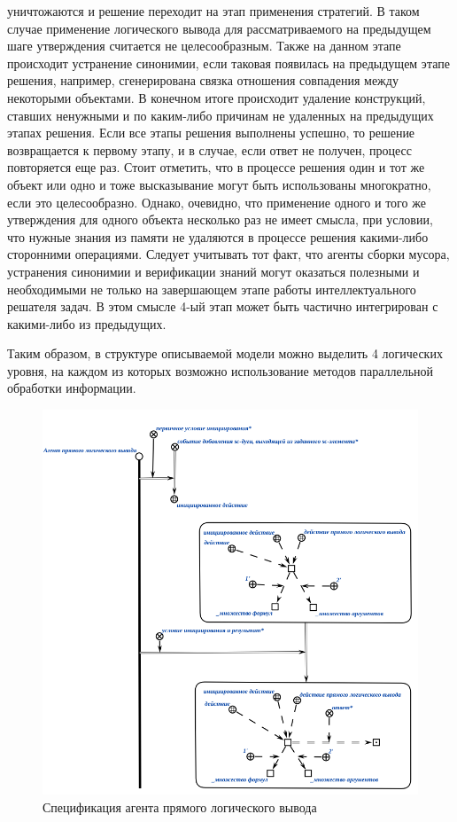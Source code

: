 \begin{itemize}
{	уничтожаются и решение переходит на этап применения стратегий. В таком случае применение логического вывода для рассматриваемого на предыдущем шаге утверждения считается не	целесообразным. Также на данном этапе происходит устранение синонимии, если таковая появилась на предыдущем этапе решения,
	например, сгенерирована связка отношения совпадения между некоторыми объектами. В конечном итоге происходит удаление конструкций, ставших ненужными и по каким-либо причинам не удаленных на предыдущих этапах решения. Если все этапы решения выполнены успешно, то решение возвращается к первому этапу, и в случае, если ответ не получен, процесс повторяется еще раз. Стоит отметить, что в процессе решения один и тот же объект или одно и тоже высказывание могут быть использованы многократно, если это целесообразно. Однако, очевидно, что применение одного и того же утверждения для одного объекта несколько раз не имеет смысла, при условии, что нужные знания из памяти не удаляются в процессе решения какими-либо сторонними операциями. Следует учитывать тот факт, что агенты сборки мусора, устранения синонимии и верификации знаний могут оказаться полезными и необходимыми не только на завершающем этапе работы интеллектуального решателя задач. В этом смысле 4-ый этап может быть частично интегрирован с какими-либо из предыдущих.}
\end{itemize}

Таким образом, в структуре описываемой модели можно выделить 4 логических уровня, на каждом из которых возможно использование методов параллельной обработки информации. 

\begin{figure}[H]
	\includegraphics[scale=0.8]{author/part3/figures/direct_inference_agent.png}
	\caption{Спецификация агента прямого логического вывода}
	\label{fig:direct_inference_agent}
\end{figure}

